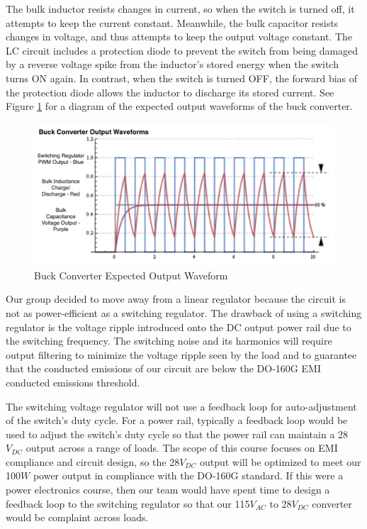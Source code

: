 \documentclass[conference]{IEEEtran}
\begin{document}
The bulk inductor resists changes in current, so when the switch is turned off, it attempts to keep the current constant. Meanwhile, the bulk capacitor resists changes in voltage, and thus attempts to keep the output voltage constant. The LC circuit includes a protection diode to prevent the switch from being damaged by a reverse voltage spike from the inductor's stored energy when the switch turns ON again. In contrast, when the switch is turned OFF, the forward bias of the protection diode allows the inductor to discharge its stored current. See Figure \ref{fig:buck_converter_waveform_diagram} for a diagram of the expected output waveforms of the buck converter.

\begin{figure}[htp]
    \centering
    \includegraphics[width=1.0\linewidth]{buck_converter_waveform.png}
    \caption{Buck Converter Expected Output Waveform }
    \label{fig:buck_converter_waveform_diagram}
\end{figure}

Our group decided to move away from a linear regulator because the circuit is not as power-efficient as a switching regulator. The drawback of using a switching regulator is the voltage ripple introduced onto the DC output power rail due to the switching frequency. The switching noise and its harmonics will require output filtering to minimize the voltage ripple seen by the load and to guarantee that the conducted emissions of our circuit are below the DO-160G EMI conducted emissions threshold. 

The switching voltage regulator will not use a feedback loop for auto-adjustment of the switch's duty cycle. For a power rail, typically a feedback loop would be used to adjust the switch's duty cycle so that the power rail can maintain a 28$V_{DC}$ output across a range of loads. The scope of this course focuses on EMI compliance and circuit design, so the 28$V_{DC}$ output will be optimized to meet our 100$W$ power output in compliance with the DO-160G standard. If this were a power electronics course, then our team would have spent time to design a feedback loop to the switching regulator so that our 115$V_{AC}$ to 28$V_{DC}$ converter would be complaint across loads.
\end{document}
